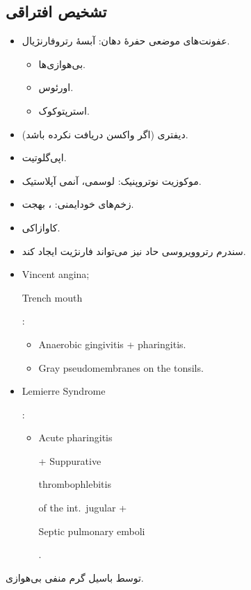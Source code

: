 \documentclass[12pt,a4paper]{article}
\providecommand{\en}[1]{\lr{#1}}
\newcommand{\phhl}[1]{\colorbox{yellow!35}{\strut #1}}
\begin{document}
\subsection*{تشخیص افتراقی}
\begin{itemize}
\item عفونت‌های موضعی حفرهٔ دهان: آبسهٔ رتروفارنژیال.
  \begin{itemize}
  \item بی‌هوازی‌ها.
  \item \en{S.} اورئوس.
  \item استرپتوکوک.
  \end{itemize}
\item دیفتری (اگر واکسن دریافت نکرده باشد).
\item اپی‌گلوتیت.
\item موکوزیت نوتروپنیک: لوسمی، آنمی آپلاستیک.
\item زخم‌های خودایمنی: \en{SLE}، بهجت.
\item کاوازاکی.
\item سندرم رتروویروسی حاد نیز می‌تواند فارنژیت ایجاد کند.
\end{itemize}
\begin{latin}
\begin{itemize}
\item Vincent angina; \phhl{Trench mouth}:
  \begin{itemize}
  \item Anaerobic gingivitis + pharingitis.
  \item Gray pseudomembranes on the tonsils.
  \end{itemize}
\item \phhl{Lemierre Syndrome}:
  \begin{itemize}
\item \phhl{Acute pharingitis} + Suppurative \phhl{thrombophlebitis} of the int.\ jugular
        \newline + \phhl{Septic pulmonary emboli}.
  \end{itemize}
\end{itemize}
\end{latin}
توسط باسیل گرم منفی بی‌هوازی.
\end{document}
